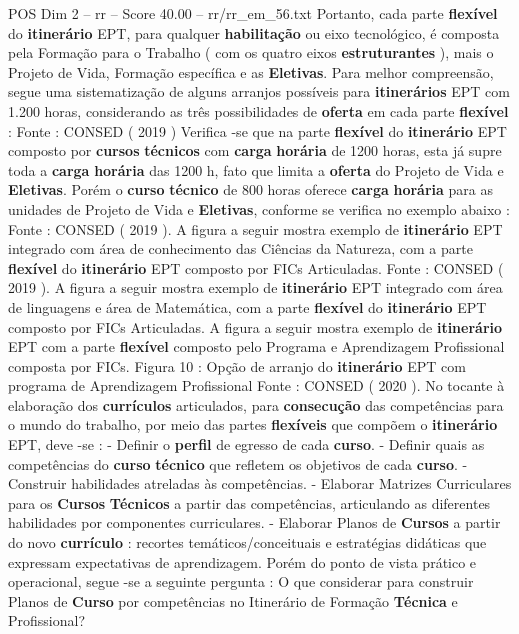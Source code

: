 \begin{textsample}{POS Dim 2 – rr – Score 40.00 – rr/rr\_em\_56.txt}
Portanto, cada parte \textbf{flexível} do \textbf{itinerário} EPT, para qualquer \textbf{habilitação} ou eixo tecnológico, é composta pela Formação para o Trabalho ( com os quatro eixos \textbf{estruturantes} ), mais o Projeto de Vida, Formação específica e as \textbf{Eletivas}.
Para melhor compreensão, segue uma sistematização de alguns arranjos possíveis para \textbf{itinerários} EPT com 1.200 horas, considerando as três possibilidades de \textbf{oferta} em cada parte \textbf{flexível} : Fonte : CONSED ( 2019 ) Verifica -se que na parte \textbf{flexível} do \textbf{itinerário} EPT composto por \textbf{cursos} \textbf{técnicos} com \textbf{carga} \textbf{horária} de 1200 horas, esta já supre toda a \textbf{carga} \textbf{horária} das 1200 h, fato que limita a \textbf{oferta} do Projeto de Vida e \textbf{Eletivas}.
Porém o \textbf{curso} \textbf{técnico} de 800 horas oferece \textbf{carga} \textbf{horária} para as unidades de Projeto de Vida e \textbf{Eletivas}, conforme se verifica no exemplo abaixo : Fonte : CONSED ( 2019 ).
A figura a seguir mostra exemplo de \textbf{itinerário} EPT integrado com área de conhecimento das Ciências da Natureza, com a parte \textbf{flexível} do \textbf{itinerário} EPT composto por FICs Articuladas.
Fonte : CONSED ( 2019 ).
A figura a seguir mostra exemplo de \textbf{itinerário} EPT integrado com área de linguagens e área de Matemática, com a parte \textbf{flexível} do \textbf{itinerário} EPT composto por FICs Articuladas.
A figura a seguir mostra exemplo de \textbf{itinerário} EPT com a parte \textbf{flexível} composto pelo Programa e Aprendizagem Profissional composta por FICs.
Figura 10 : Opção de arranjo do \textbf{itinerário} EPT com programa de Aprendizagem Profissional Fonte : CONSED ( 2020 ).
No tocante à elaboração dos \textbf{currículos} articulados, para \textbf{consecução} das competências para o mundo do trabalho, por meio das partes \textbf{flexíveis} que compõem o \textbf{itinerário} EPT, deve -se : - Definir o \textbf{perfil} de egresso de cada \textbf{curso}. - Definir quais as competências do \textbf{curso} \textbf{técnico} que refletem os objetivos de cada \textbf{curso}. - Construir habilidades atreladas às competências. - Elaborar Matrizes Curriculares para os \textbf{Cursos} \textbf{Técnicos} a partir das competências, articulando as diferentes habilidades por componentes curriculares. - Elaborar Planos de \textbf{Cursos} a partir do novo \textbf{currículo} : recortes temáticos/conceituais e estratégias didáticas que expressam expectativas de aprendizagem.
Porém do ponto de vista prático e operacional, segue -se a seguinte pergunta : O que considerar para construir Planos de \textbf{Curso} por competências no Itinerário de Formação \textbf{Técnica} e Profissional?

\end{textsample}
